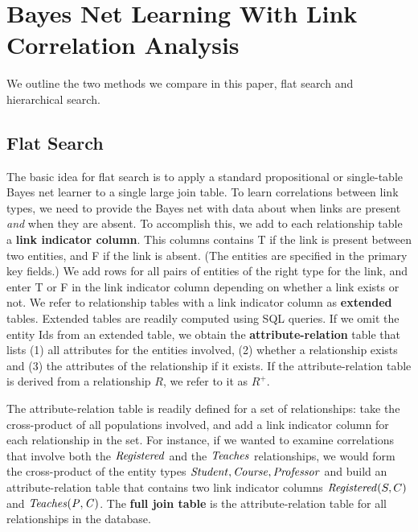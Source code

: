 \documentclass{article}
\begin{document}
\section{Bayes Net Learning With Link Correlation Analysis}

We outline the two methods we compare in this paper, flat search and hierarchical search. 

\subsection{Flat Search}
The basic idea for flat search is to apply a standard propositional or single-table Bayes net learner to a single large join table. 
To learn correlations between link types, we need to provide the Bayes net with data about when links are present {\em and} when they are absent. To accomplish this, we add to each relationship table a \textbf{link indicator column}. This columns contains T if the link is present between two entities, and F if the link is absent. (The entities are specified in the primary key fields.) We add rows for all pairs of entities of the right type for the link, and enter T or F in the link indicator column depending on whether a link exists or not. We refer to relationship tables with a link indicator column as \textbf{extended} tables. Extended tables are readily computed using SQL queries. If we omit the entity Ids from an extended table, we obtain the \textbf{attribute-relation} table that lists (1) all attributes for the entities involved, (2) whether a relationship exists and (3) the attributes of the relationship if it exists. If the attribute-relation table is derived from a relationship $R$, we refer to it as $R^{+}$. 

The attribute-relation table is readily defined for a set of relationships: take the cross-product of all populations involved, and add a link indicator column for each relationship in the set.
For instance, if we wanted to examine correlations that involve both the $\mathit{Registered}$ and the $\it{Teaches}$ relationships, we would form the cross-product of the entity types $\it{Student},\it{Course},\it{Professor}$ and build an attribute-relation table that contains two link indicator columns $\mathit{Registered}(S,C)$ and $\it{Teaches}(P,C)$. 
The \textbf{full join table} is the attribute-relation table for all relationships in the database.
 
\end{document}

